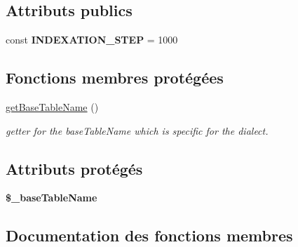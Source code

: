 \subsection*{Attributs publics}
\begin{DoxyCompactItemize}
\item 
\hypertarget{classConjugationDataProviderBase_ae4dd22eb6f5454f08a9a9c3ba01e5c89}{}\label{classConjugationDataProviderBase_ae4dd22eb6f5454f08a9a9c3ba01e5c89} 
const {\bfseries I\+N\+D\+E\+X\+A\+T\+I\+O\+N\+\_\+\+S\+T\+EP} = 1000
\end{DoxyCompactItemize}
\subsection*{Fonctions membres protégées}
\begin{DoxyCompactItemize}
\item 
\hypertarget{classConjugationDataProviderBase_a3649ad489ccc588dccf840445c7432eb}{}\label{classConjugationDataProviderBase_a3649ad489ccc588dccf840445c7432eb} 
\hyperlink{classConjugationDataProviderBase_a3649ad489ccc588dccf840445c7432eb}{get\+Base\+Table\+Name} ()
\begin{DoxyCompactList}\small\item\em getter for the base\+Table\+Name which is specific for the dialect. \end{DoxyCompactList}\end{DoxyCompactItemize}
\subsection*{Attributs protégés}
\begin{DoxyCompactItemize}
\item 
\hypertarget{classConjugationDataProviderBase_ad50a1bb414ca13b00edff121abe0d0a0}{}\label{classConjugationDataProviderBase_ad50a1bb414ca13b00edff121abe0d0a0} 
{\bfseries \$\+\_\+base\+Table\+Name}
\end{DoxyCompactItemize}


\subsection{Documentation des fonctions membres}
\hypertarget{classConjugationDataProviderBase_a645b9064803b3f6b9796fbacdb26548b}{}\label{classConjugationDataProviderBase_a645b9064803b3f6b9796fbacdb26548b} 
